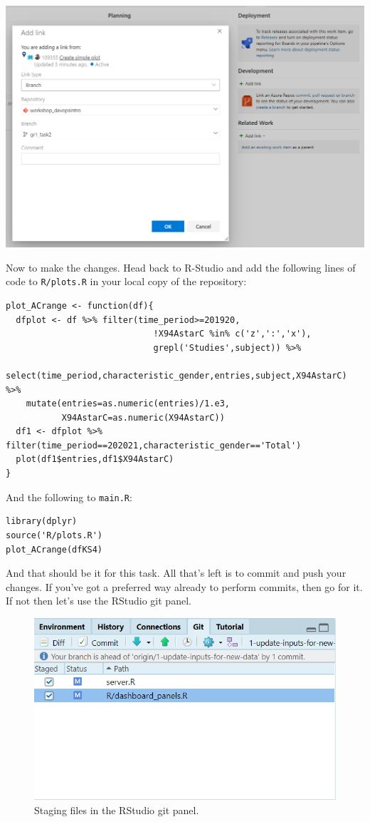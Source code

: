 \documentclass[
  12pt,
]{article}
\begin{document}
\begin{center}\includegraphics[width=0.82\linewidth]{images/DevOpsdemo/DevOps_Boards_linkbranch} \end{center}

Now to make the changes. Head back to R-Studio and add the following
lines of code to \texttt{R/plots.R} in your local copy of the
repository:

\begin{verbatim}
plot_ACrange <- function(df){
  dfplot <- df %>% filter(time_period>=201920,
                             !X94AstarC %in% c('z',':','x'),
                             grepl('Studies',subject)) %>% 
    select(time_period,characteristic_gender,entries,subject,X94AstarC) %>%
    mutate(entries=as.numeric(entries)/1.e3,
           X94AstarC=as.numeric(X94AstarC))
  df1 <- dfplot %>% filter(time_period==202021,characteristic_gender=='Total')
  plot(df1$entries,df1$X94AstarC)
}
\end{verbatim}

And the following to \texttt{main.R}:

\begin{verbatim}
library(dplyr)
source('R/plots.R')
plot_ACrange(dfKS4)
\end{verbatim}

And that should be it for this task. All that's left is to commit and
push your changes. If you've got a preferred way already to perform
commits, then go for it. If not then let's use the RStudio git panel.

\begin{figure}

{\centering \includegraphics[width=0.64\linewidth]{images/gitdemo/gitdemo-RStudio-gitpanel} 

}

\caption{Staging files in the RStudio git panel.}\label{fig:unnamed-chunk-14}
\end{figure}
\end{document}
